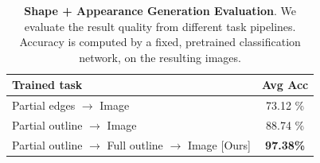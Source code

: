 

\begin{table}[t]
    \centering
        \begin{tabular}{l c}
        \toprule
        \textbf{Trained task} & \textbf{Avg Acc} \\ \midrule
        Partial edges $\rightarrow$ Image & 73.12 \% \\
        Partial outline $\rightarrow$ Image & 88.74 \% \\
        Partial outline $\rightarrow$ Full outline $\rightarrow$ Image [Ours] & \textbf{97.38\%}  \\
        \bottomrule %
        \end{tabular}
    \caption{\label{table:2step_eval} \textbf{Shape + Appearance Generation Evaluation}. We evaluate the result quality from different task pipelines. Accuracy is computed by a fixed, pretrained classification network, on the resulting images.
    }
\end{table}


    
